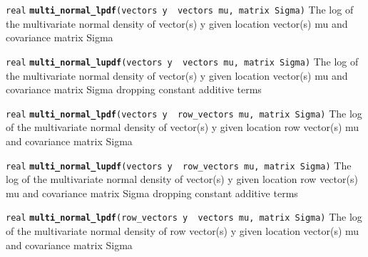 \documentclass[
  10pt,
]{book}
\begin{document}

\texttt{real} \textbf{\texttt{multi\_normal\_lpdf}}\texttt{(vectors\ y\ \textbar{}\ vectors\ mu,\ matrix\ Sigma)}\newline
The log of the multivariate normal density of vector(s) y given
location vector(s) mu and covariance matrix Sigma


\texttt{real} \textbf{\texttt{multi\_normal\_lupdf}}\texttt{(vectors\ y\ \textbar{}\ vectors\ mu,\ matrix\ Sigma)}\newline
The log of the multivariate normal density of vector(s) y given
location vector(s) mu and covariance matrix Sigma dropping constant additive
terms


\texttt{real} \textbf{\texttt{multi\_normal\_lpdf}}\texttt{(vectors\ y\ \textbar{}\ row\_vectors\ mu,\ matrix\ Sigma)}\newline
The log of the multivariate normal density of vector(s) y given
location row vector(s) mu and covariance matrix Sigma


\texttt{real} \textbf{\texttt{multi\_normal\_lupdf}}\texttt{(vectors\ y\ \textbar{}\ row\_vectors\ mu,\ matrix\ Sigma)}\newline
The log of the multivariate normal density of vector(s) y given
location row vector(s) mu and covariance matrix Sigma dropping constant additive
terms


\texttt{real} \textbf{\texttt{multi\_normal\_lpdf}}\texttt{(row\_vectors\ y\ \textbar{}\ vectors\ mu,\ matrix\ Sigma)}\newline
The log of the multivariate normal density of row vector(s) y given
location vector(s) mu and covariance matrix Sigma

\end{document}
